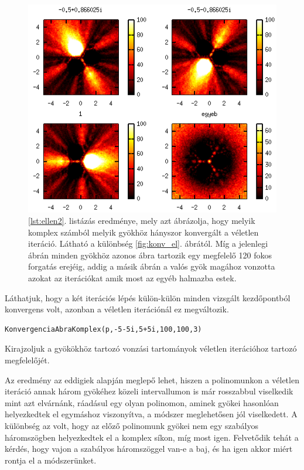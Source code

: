 \documentclass[a4paper,12pt]{report}
\begin{document}
		    \begin{figure}[hp]
					\centering
					\includegraphics[scale=0.6]{kepek/veletlen.png}
					\caption{\ref{lst:ellen2}. listázás eredménye, mely azt ábrázolja, hogy melyik komplex számból melyik gyökhöz hányszor konvergált a véletlen iteráció. Látható a különbség \ref{fig:konv_el}. ábrától. Míg a jelenlegi ábrán minden gyökhöz azonos ábra tartozik egy megfelelő 120 fokos forgatás erejéig, addig a másik ábrán a valós gyök magához vonzotta azokat az iterációkat amik most az egyéb halmazba estek.}
				\end{figure}
                Láthatjuk, hogy a két iterációs lépés külön-külön minden vizsgált kezdőpontból konvergens volt, azonban a véletlen iterációnál ez megváltozik.
                \begin{singlespace}
                \begin{lstlisting}[caption=Bemenet,label=lst:ellen2]
KonvergenciaAbraKomplex(p,-5-5i,5+5i,100,100,3)
                \end{lstlisting}
                \end{singlespace}
                Kirajzoljuk a gyökökhöz tartozó vonzási tartományok véletlen iterációhoz tartozó megfelelőjét.



Az eredmény az eddigiek alapján meglepő lehet, hiszen a polinomunkon a véletlen iteráció annak három gyökéhez közeli intervallumon is már rosszabbul viselkedik mint azt elvárnánk, ráadásul egy olyan polinomon, aminek gyökei hasonlóan helyezkedtek el egymáshoz viszonyítva, a módszer meglehetősen jól viselkedett. A különbség az volt, hogy az előző polinomunk gyökei nem egy szabályos háromszögben helyezkedtek el a komplex síkon, míg most igen. Felvetődik tehát a kérdés, hogy vajon a szabályos háromszöggel van-e a baj, és ha igen akkor miért rontja el a módszerünket.
\end{document}
